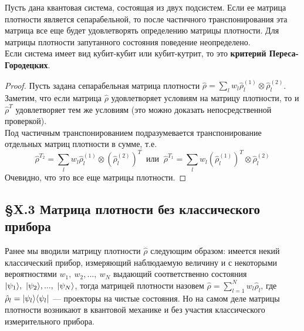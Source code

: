 \begin{theorem}
	Пусть дана квантовая система, состоящая из двух подсистем. Если ее матрица плотности является сепарабельной, то после частичного транспонирования эта матрица все еще будет удовлетворять определению матрицы плотности. Для матрицы плотности запутанного состояния поведение неопределено.\\
	Если система имеет вид кубит-кубит или кубит-кутрит, то это \textbf{критерий Переса-Городецких}.
	
\end{theorem}
\begin{proof}
	Пусть задана сепарабельная матрица плотности $\hat{\rho} = \sum\limits_l w_l \hat{\rho}_l^{(1)}\otimes\hat{\rho}_l^{(2)}$.\\
	Заметим, что если матрица $\hat{\rho}$ удовлетворяет условиям на матрицу плотности, то и $\hat{\rho}^T$ удовлетворяет тем же условиям (это можно доказать непосредственной проверкой).\\
	Под частичным транспонированием подразумевается транспонирование отдельных матриц плотности в сумме, т.е.
	\[
	\hat{\rho}^{T_2} = \sum\limits_l w_l \hat{\rho}_l^{(1)}\otimes(\hat{\rho}_l^{(2)})^T \ \text{ или } \ \hat{\rho}^{T_1} = \sum\limits_l w_l (\hat{\rho}_l^{(1)})^T\otimes\hat{\rho}_l^{(2)}
	\]
	Очевидно, что это все еще матрицы плотности.
\end{proof}





\subsection{\S X.3 Матрица плотности без классического прибора}
Ранее мы вводили матрицу плотности $\hat{\rho}$ следующим образом: имеется некий классический прибор, измеряющий наблюдаемую величину и с некоторыми вероятностями $w_1,~w_2, ...,~w_N$ выдающий соответственно состояния $| \psi_1 \rangle,~| \psi_2 \rangle, ...,~| \psi_N \rangle$, тогда матрицей плотности назовем $\hat{\rho} = \sum\limits_{l=1}^N w_l\hat{\rho}_l$, где $\hat{\rho}_l = | \psi_l \rangle\langle \psi_l |$ --- проекторы на чистые состояния. Но на самом деле матрицы плотности возникают в квантовой механике и без участия классического измерительного прибора.\\

